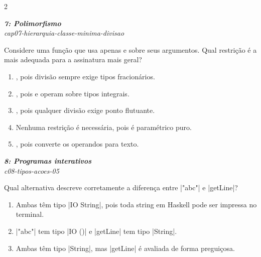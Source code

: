 \documentclass[a4paper,10pt,brazil]{article}
\begin{document}
\begin{multicols}{2}
\begin{enumerate}
\end{enumerate}

\begin{flushright}
  \footnotesize
  \textit{\textbf{7: Polimorfismo}}\\
  \textit{cap07-hierarquia-classe-minima-divisao}\\

\end{flushright}
Considere uma função que usa apenas  e  sobre seus argumentos. Qual restrição é a mais adequada para a assinatura mais geral?
\begin{enumerate}
  \item {}, pois divisão sempre exige tipos fracionários.
  \item {}, pois  e  operam sobre tipos integrais.
  \item {}, pois qualquer divisão exige ponto flutuante.
  \item Nenhuma restrição é necessária, pois  é paramétrico puro.
  \item {}, pois  converte os operandos para texto.

\end{enumerate}

\begin{flushright}
  \footnotesize
  \textit{\textbf{8: Programas interativos}}\\
  \textit{c08-tipos-acoes-05}\\

\end{flushright}
Qual alternativa descreve corretamente a diferença entre \haskellinline|"abc"| e \haskellinline|getLine|?

\begin{enumerate}
  \item Ambas têm tipo \haskellinline|IO String|, pois toda string em Haskell pode ser impressa no terminal.

  \item \haskellinline|"abc"| tem tipo \haskellinline|IO ()| e \haskellinline|getLine| tem tipo \haskellinline|String|.

  \item Ambas têm tipo \haskellinline|String|, mas \haskellinline|getLine| é avaliada de forma preguiçosa.


\end{enumerate}
\end{multicols}
\end{document}
